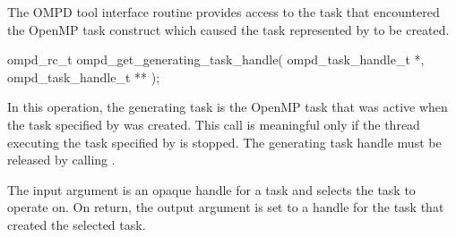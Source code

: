%

\label{subsubsubsec:ompd_get_generating_task_handle}
\summary
The OMPD tool interface routine  provides access to 
the task that encountered the OpenMP task construct which caused the task represented by 
 to be created.

\format

\begin{cspecific}
\begin{ompSyntax}
ompd_rc_t ompd_get_generating_task_handle(
  ompd_task_handle_t *,
  ompd_task_handle_t **
);
\end{ompSyntax}
\end{cspecific}


\descr

In this operation, the generating task is the OpenMP task that was active when
the task specified by  was created. This call is meaningful only if the 
thread executing the task specified
by   is stopped. The generating task handle must be released by calling
.

\argdesc
The input argument  is an opaque handle for a task and selects the task to operate on.
On return, the output argument  is set to a handle for the task
that created the selected task.


